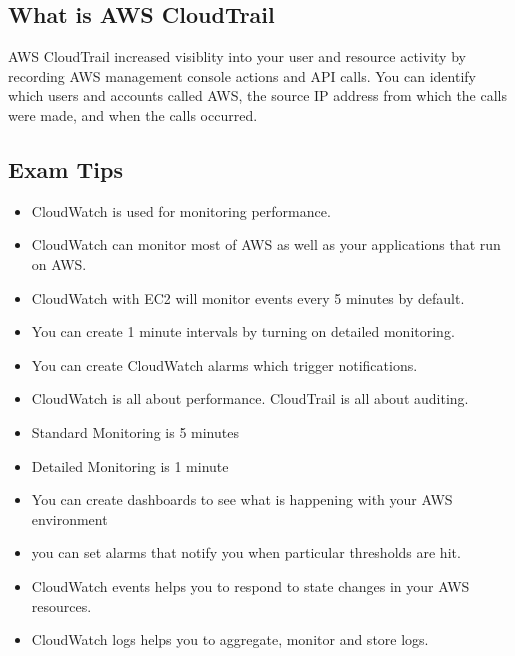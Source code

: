 \documentclass{article}
\begin{document}
\subsection{What is AWS CloudTrail}
AWS CloudTrail increased visiblity into your user and resource activity by recording AWS management console actions and API calls. You can identify which users and accounts called AWS, the source IP address from which the calls were made, and when the calls occurred.

\subsection{Exam Tips}
\begin{itemize}
\item
CloudWatch is used for monitoring performance.

\item
CloudWatch can monitor most of AWS as well as your applications that run on AWS.

\item
CloudWatch with EC2 will monitor events every 5 minutes by default.

\item
You can create 1 minute intervals by turning on detailed monitoring.

\item
You can create CloudWatch alarms which trigger notifications.

\item
CloudWatch is all about performance. CloudTrail is all about auditing.

\item
Standard Monitoring is 5 minutes

\item
Detailed Monitoring is 1 minute

\item
You can create dashboards to see what is happening with your AWS environment

\item
you can set alarms that notify you when particular thresholds are hit.

\item
CloudWatch events helps you to respond to state changes in your AWS resources.

\item
CloudWatch logs helps you to aggregate, monitor and store logs.
\end{itemize}
\end{document}
